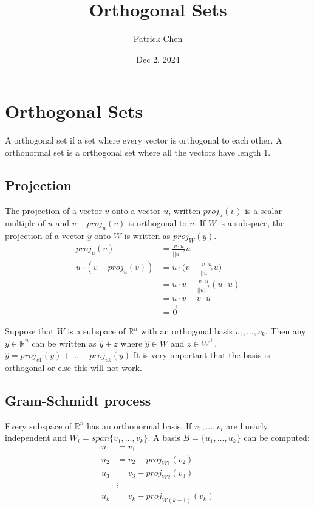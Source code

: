\documentclass{article}
\title{Orthogonal Sets}
\author{Patrick Chen}
\date{Dec 2, 2024}
\theoremstyle{mytheoremstyle}
\theoremstyle{mytheoremstyle}
\theoremstyle{myproblemstyle}
\begin{document}
    \maketitle
    \section*{Orthogonal Sets}
    A orthogonal set if a set where every vector is orthogonal to each other. A
    orthonormal set is a orthogonal set where all the vectors have length 1.

    \subsection*{Projection}
    The projection of a vector $v$ onto a vector $u$, written $proj_u(v)$ is a
    scalar multiple of $u$ and $v-proj_u(v)$ is orthogonal to $u$. If $W$ is a
    subspace, the projection of a vector $y$ onto $W$ is written as $proj_W(y)$.
    \begin{align*}
        proj_u (v) &= \frac{v\cdot u}{||u||^2} u \\
        u\cdot (v-proj_u(v)) &= u\cdot \Big(v - \frac{v\cdot u}{||u||^2} u\Big) \\
        &= u\cdot v - \frac{v\cdot u}{||u||^2} (u\cdot u) \\
        &= u\cdot v - v\cdot u \\
        &= \vec{0}
    \end{align*}

    Suppose that $W$ is a subspace of $\mathbb{R}^n$ with an orthogonal basis
    $v_1,\dots,v_k$. Then any $y\in \mathbb{R}^n$ can be written as $\hat{y}+z$
    where $\hat{y} \in W$ and $z\in W^\perp$.
    $\hat{y}=proj_{v1}(y)+\dots+proj_{vk}(y)$ It is very important that the basis is
    orthogonal or else this will not work.

    \subsection*{Gram-Schmidt process}
    Every subspace of $\mathbb{R}^n$ has an orthonormal basis. If
    $v_1,\dots,v_i$ are linearly independent and $W_i = span\{v_1,\dots,v_k\}$.
    A basis $B=\{u_1,\dots,u_k\}$ can be computed:
    \begin{align*}
        u_1 &= v_1 \\
        u_2 &= v_2 - proj_{W1}(v_2) \\
        u_3 &= v_3 - proj_{W2}(v_3) \\
        & \vdots \\
        u_k &= v_k - proj_{W(k-1)}(v_k)
    \end{align*}
\end{document}
